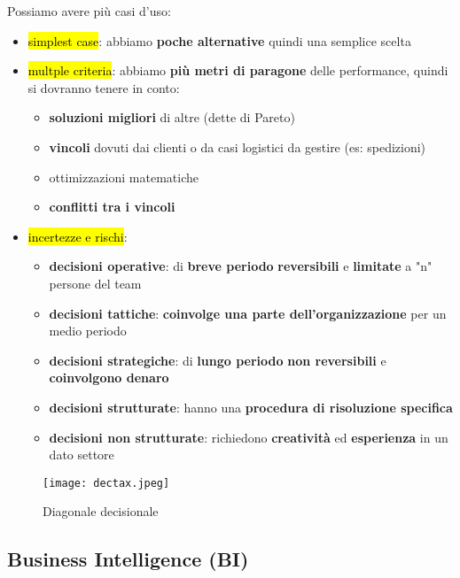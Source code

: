 Possiamo avere più casi d'uso:
\begin{itemize}
	\item \hl{simplest case}: abbiamo \textbf{poche alternative} quindi una semplice scelta
	\item \hl{multple criteria}: abbiamo \textbf{più metri di paragone} delle performance, quindi si dovranno tenere in conto:
	
	\begin{itemize}
		\item \textbf{soluzioni migliori} di altre (dette di Pareto)
		\item \textbf{vincoli} dovuti dai clienti o da casi logistici da gestire (es: spedizioni)
		\item ottimizzazioni matematiche
		\item \textbf{conflitti tra i vincoli}
	\end{itemize}
	
	\item \hl{incertezze e rischi}: 
	
	\begin{itemize}
		\item \textbf{decisioni operative}: di \textbf{breve periodo}  \textbf{reversibili} e \textbf{limitate} a "n" persone del team
		
		\item \textbf{decisioni tattiche}: \textbf{coinvolge una parte dell'organizzazione} per un medio periodo
		
		\item \textbf{decisioni strategiche}: di \textbf{lungo periodo}  \textbf{non reversibili} e \textbf{coinvolgono denaro}
		
		\item \textbf{decisioni strutturate}: hanno una \textbf{procedura di risoluzione specifica}
		
		\item \textbf{decisioni non strutturate}: richiedono \textbf{creatività} ed \textbf{esperienza} in un  dato settore
	\end{itemize}
\end{itemize}

\begin{figure}[H]
\centering
\texttt{[image: dectax.jpeg]}
\caption{Diagonale decisionale} 
\label{diadec}
\end{figure}


\subsection{Business Intelligence (BI)}

